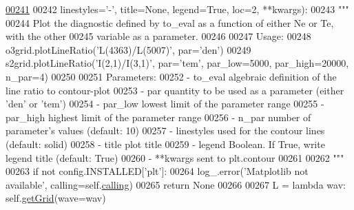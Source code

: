 \begin{DoxyCode}
\hypertarget{classpyneb_1_1core_1_1emis_grid_1_1_emis_grid_l00241}{}\hyperlink{classpyneb_1_1core_1_1emis_grid_1_1_emis_grid_afa16129c399f1215de169a6e2e67b882}{00241} 
00242                       linestyles=\textcolor{stringliteral}{'-'}, title=\textcolor{keywordtype}{None}, legend=\textcolor{keyword}{True}, loc=2, **kwargs):
00243         \textcolor{stringliteral}{"""}
00244 \textcolor{stringliteral}{        Plot the diagnostic defined by to\_eval as a function of either Ne or Te, with the other}
00245 \textcolor{stringliteral}{        variable as a parameter.}
00246 \textcolor{stringliteral}{        }
00247 \textcolor{stringliteral}{        Usage:}
00248 \textcolor{stringliteral}{            o3grid.plotLineRatio('L(4363)/L(5007)', par='den')}
00249 \textcolor{stringliteral}{            s2grid.plotLineRatio('I(2,1)/I(3,1)', par='tem', par\_low=5000, par\_high=20000, n\_par=4)}
00250 \textcolor{stringliteral}{        }
00251 \textcolor{stringliteral}{        Parameters:}
00252 \textcolor{stringliteral}{            - to\_eval      algebraic definition of the line ratio to contour-plot}
00253 \textcolor{stringliteral}{            - par          quantity to be used as a parameter (either 'den' or 'tem')}
00254 \textcolor{stringliteral}{            - par\_low      lowest limit of the parameter range}
00255 \textcolor{stringliteral}{            - par\_high     highest limit of the parameter range}
00256 \textcolor{stringliteral}{            - n\_par        number of parameter's values (default: 10)}
00257 \textcolor{stringliteral}{            - linestyles   used for the contour lines (default: solid)}
00258 \textcolor{stringliteral}{            - title        plot title}
00259 \textcolor{stringliteral}{            - legend       Boolean. If True, write legend title (default: True) }
00260 \textcolor{stringliteral}{            - **kwargs     sent to plt.contour}
00261 \textcolor{stringliteral}{            }
00262 \textcolor{stringliteral}{        """} 
00263         \textcolor{keywordflow}{if} \textcolor{keywordflow}{not} config.INSTALLED[\textcolor{stringliteral}{'plt'}]:
00264             log\_.error(\textcolor{stringliteral}{'Matplotlib not available'}, calling=self.\hyperlink{classpyneb_1_1core_1_1emis_grid_1_1_emis_grid_a19820878261ee98513e0b755e688453f}{calling})
00265             \textcolor{keywordflow}{return} \textcolor{keywordtype}{None}
00266 
00267         L = \textcolor{keyword}{lambda} wav: self.\hyperlink{classpyneb_1_1core_1_1emis_grid_1_1_emis_grid_af9a9219e5ddfcfd53c52466e2c2deb44}{getGrid}(wave=wav)

\end{DoxyCode}
